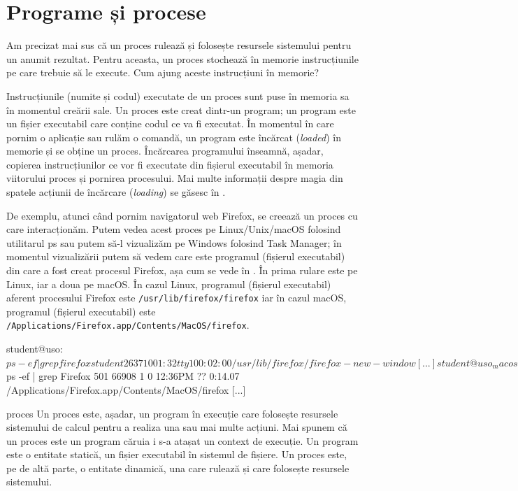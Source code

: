 \section{Programe și procese}
\label{sec:process-v-programe}

Am precizat mai sus că un proces rulează și folosește resursele sistemului
pentru un anumit rezultat. Pentru aceasta, un proces stochează în memorie
instrucțiunile pe care trebuie să le execute. Cum ajung aceste instrucțiuni în
memorie?

Instrucțiunile (numite și codul) executate de un proces sunt puse în memoria sa
în momentul creării sale. Un proces este creat dintr-un program; un program este
un fișier executabil care conține codul ce va fi executat. În momentul în care
pornim o aplicație sau rulăm o comandă, un program este încărcat
(\textit{loaded}) în memorie și se obține un proces. Încărcarea programului
înseamnă, așadar, copierea instrucțiunilor ce vor fi executate din fișierul
executabil în memoria viitorului proces și pornirea procesului. Mai multe
informații despre magia din spatele acțiunii de încărcare (\textit{loading}) se
găsesc în .

De exemplu, atunci când pornim navigatorul web Firefox, se creează un proces cu
care interacționăm. Putem vedea acest proces pe Linux/Unix/macOS folosind
utilitarul ps sau putem să-l vizualizăm pe Windows folosind Task Manager; în
momentul vizualizării putem să vedem care este programul (fișierul executabil)
din care a fost creat procesul Firefox, așa cum se vede în .
În  prima rulare este pe Linux, iar a doua pe macOS. În cazul Linux, programul (fișierul executabil) aferent procesului Firefox este \texttt{/usr/lib/firefox/firefox} iar în cazul macOS, programul (fișierul executabil) este \texttt{/Applications/Firefox.app/Contents/MacOS/firefox}.

\begin{screen}[caption={Fișierul executabil al unui process},label={lst:process:exec-for-process}]
student@uso:~$ ps -ef | grep firefox
student   2637     1  0 01:32 tty1     00:02:00 /usr/lib/firefox/firefox -new-window
[...]
student@uso_macos:~$ ps -ef | grep Firefox
501 66908     1   0 12:36PM ??         0:14.07 /Applications/Firefox.app/Contents/MacOS/firefox
[...]
\end{screen}

\begin{definition}{proces}
Un proces este, așadar, un program în execuție care folosește resursele
sistemului de calcul pentru a realiza una sau mai multe acțiuni. Mai
spunem că un proces este un program căruia i s-a atașat un context de
execuție. Un program este o entitate statică, un fișier executabil în
sistemul de fișiere. Un proces este, pe de altă parte, o entitate
dinamică, una care rulează și care folosește resursele sistemului.
\end{definition}

